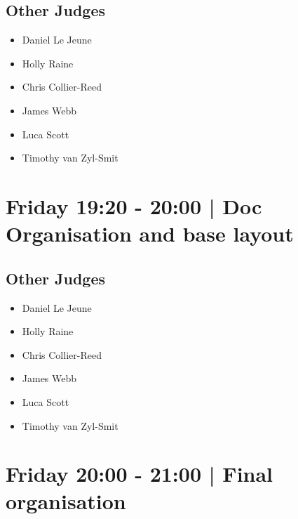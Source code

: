\documentclass[10pt]{article}
\begin{document}
        \subsection*{Other Judges}
        
            \begin{itemize}
                            \item Daniel Le Jeune
                            \item Holly Raine
                            \item Chris Collier-Reed
                            \item James Webb
                            \item Luca Scott
                            \item Timothy van Zyl-Smit
                        \end{itemize}
        

            \section*{Friday 19:20
        -
        20:00
        |
         Doc Organisation and base layout}
        
                
        \subsection*{Other Judges}
        
            \begin{itemize}
                            \item Daniel Le Jeune
                            \item Holly Raine
                            \item Chris Collier-Reed
                            \item James Webb
                            \item Luca Scott
                            \item Timothy van Zyl-Smit
                        \end{itemize}
        

            \section*{Friday 20:00
        -
        21:00
        |
         Final organisation}
        
                
\end{document}
